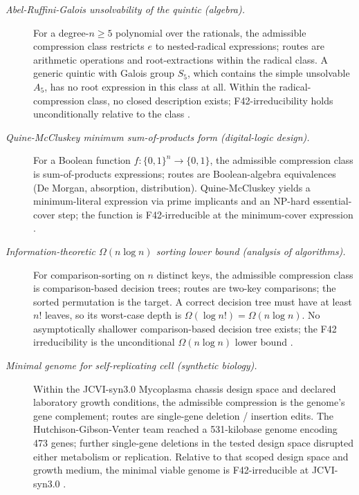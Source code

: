 \documentclass[11pt]{article}
\theoremstyle{definition}
\begin{document}
\begin{description}
\item[\emph{Abel-Ruffini-Galois unsolvability of the
quintic (algebra).}]
For a degree-\(n\ge 5\) polynomial over the rationals,
the admissible compression class restricts \(e\) to
nested-radical expressions; routes are arithmetic
operations and root-extractions within the radical
class.  A generic quintic with Galois group \(S_5\),
which contains the simple unsolvable \(A_5\), has no
root expression in this class at all.  Within the
radical-compression class, no closed description
exists; F42-irreducibility holds unconditionally
relative to the class \citep{Abel1824Quintic}.

\item[\emph{Quine-McCluskey minimum sum-of-products
form (digital-logic design).}]
For a Boolean function \(f:\{0,1\}^n\to\{0,1\}\), the
admissible compression class is sum-of-products
expressions; routes are Boolean-algebra equivalences
(De Morgan, absorption, distribution).  Quine-McCluskey
yields a minimum-literal expression via prime
implicants and an NP-hard essential-cover step; the
function is F42-irreducible at the minimum-cover
expression \citep{Quine1952Boolean}.

\item[\emph{Information-theoretic
\(\Omega(n\log n)\) sorting lower bound (analysis of
algorithms).}]
For comparison-sorting on \(n\) distinct keys, the
admissible compression class is comparison-based
decision trees; routes are two-key comparisons; the
sorted permutation is the target.  A correct decision
tree must have at least \(n!\) leaves, so its
worst-case depth is \(\Omega(\log n!) = \Omega(n\log
n)\).  No asymptotically shallower comparison-based
decision tree exists; the F42 irreducibility is the
unconditional \(\Omega(n\log n)\) lower bound
\citep{Knuth1998TAOCPv3}.

\item[\emph{Minimal genome for self-replicating cell
(synthetic biology).}]
Within the JCVI-syn3.0 Mycoplasma chassis design
space and declared laboratory growth conditions, the
admissible compression is the genome's gene
complement; routes are single-gene deletion /
insertion edits.  The Hutchison-Gibson-Venter team
reached a 531-kilobase genome encoding 473 genes;
further single-gene deletions in the tested design
space disrupted either metabolism or replication.
Relative to that scoped design space and growth
medium, the minimal viable genome is
F42-irreducible at JCVI-syn3.0
\citep{Hutchison2016MinimalGenome}.


\end{description}
\end{document}
